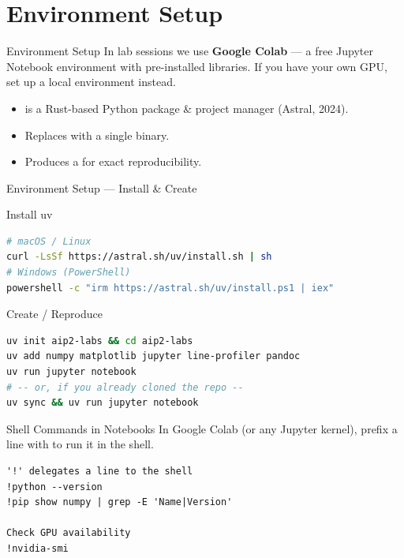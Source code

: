 \section{Environment Setup}

\begin{frame}{Environment Setup}
    In lab sessions we use \textbf{Google Colab} --- a free Jupyter Notebook environment with pre-installed libraries.
    If you have your own GPU, set up a local  environment instead.

    \begin{itemize}
        \item {} is a Rust-based Python package \& project manager (Astral, 2024).
        \item Replaces  with a single binary.
        \item Produces a  for exact reproducibility.
    \end{itemize}
\end{frame}

\begin{frame}[fragile]{Environment Setup --- Install \& Create}
    \begin{block}{Install uv}
    \begin{lstlisting}[language=bash]
# macOS / Linux
curl -LsSf https://astral.sh/uv/install.sh | sh
# Windows (PowerShell)
powershell -c "irm https://astral.sh/uv/install.ps1 | iex"
    \end{lstlisting}
    \end{block}

    \begin{block}{Create / Reproduce}
    \begin{lstlisting}[language=bash]
uv init aip2-labs && cd aip2-labs
uv add numpy matplotlib jupyter line-profiler pandoc
uv run jupyter notebook
# -- or, if you already cloned the repo --
uv sync && uv run jupyter notebook
    \end{lstlisting}
    \end{block}
\end{frame}

\begin{frame}[fragile]{Shell Commands in Notebooks}
    In Google Colab (or any Jupyter kernel), prefix a line with \code{!} to run it in the shell.

    \begin{lstlisting}
'!' delegates a line to the shell
!python --version
!pip show numpy | grep -E 'Name|Version'

Check GPU availability
!nvidia-smi
    \end{lstlisting}
\end{frame}
